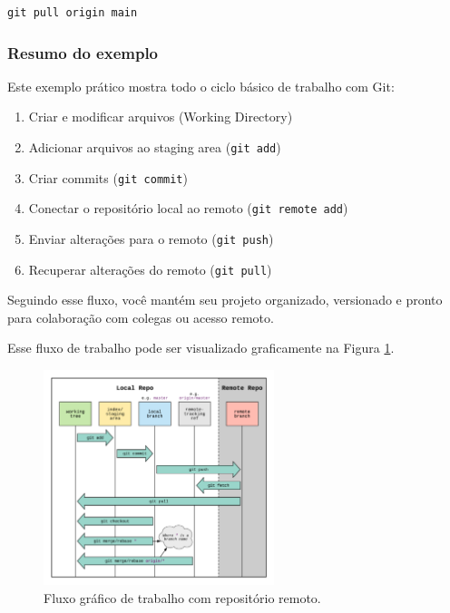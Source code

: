 \begin{lstlisting}[style=shellstyle]
git pull origin main
\end{lstlisting}

\subsubsection*{Resumo do exemplo}

Este exemplo prático mostra todo o ciclo básico de trabalho com Git:

\begin{enumerate}
    \item Criar e modificar arquivos (Working Directory)
    \item Adicionar arquivos ao staging area (\texttt{git add})
    \item Criar commits (\texttt{git commit})
    \item Conectar o repositório local ao remoto (\texttt{git remote add})
    \item Enviar alterações para o remoto (\texttt{git push})
    \item Recuperar alterações do remoto (\texttt{git pull})
\end{enumerate}

Seguindo esse fluxo, você mantém seu projeto organizado, versionado e pronto para colaboração com colegas ou acesso remoto.

Esse fluxo de trabalho pode ser visualizado graficamente na Figura \ref{fig:github_areas_flow}.

\begin{figure}[H]
\centering
\includegraphics[width=0.6\textwidth]{imgs/github_areas_flow.png}
\caption{Fluxo gráfico de trabalho com repositório remoto.}
\label{fig:github_areas_flow}
\end{figure}